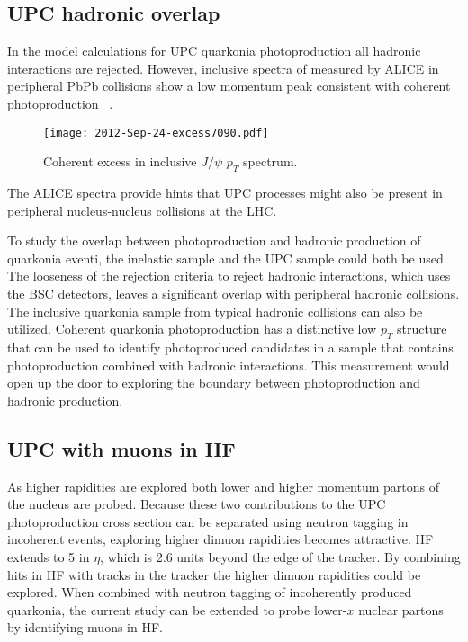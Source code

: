     \subsection{UPC hadronic overlap}
      In the model calculations for UPC quarkonia 
        photoproduction all hadronic interactions are rejected.
      However, inclusive \pt{} spectra of \JPsi{} measured by ALICE in 
        peripheral PbPb collisions show a low momentum peak consistent with 
        coherent photoproduction ~\cite{aliceIclJpsi}.
      \begin{figure}[h]
        \centering
        \texttt{[image: 2012-Sep-24-excess7090.pdf]}
        \caption{Coherent excess in inclusive $J/\psi$ $p_{T}$ spectrum.}
        \label{fig:alicePtSpecLowPt}
      \end{figure}
      The ALICE spectra provide hints that UPC processes might also be present 
        in peripheral nucleus-nucleus collisions at the LHC.
      
      To study the overlap between photoproduction and hadronic production of 
        quarkonia eventi, the inelastic sample and the UPC sample could both be
        used. 
      The looseness of the rejection criteria to reject hadronic interactions,
        which uses the BSC detectors, leaves a significant overlap with 
        peripheral hadronic collisions. 
      The inclusive quarkonia sample from typical hadronic collisions can also 
        be utilized. 
      Coherent quarkonia photoproduction has a distinctive low $p_{T}$ structure
        that can be used to identify photoproduced candidates in a sample that 
        contains photoproduction combined with hadronic interactions.
      This measurement would open up the door to exploring the boundary between
        photoproduction and hadronic production.

    \subsection{UPC \JPsi{} with muons in HF}
      As higher rapidities are explored both lower and higher momentum partons
        of the nucleus are probed. 
      Because these two contributions to the UPC photoproduction cross section 
        can be separated using neutron tagging in incoherent events, exploring
        higher dimuon rapidities becomes attractive.
      HF extends to 5 in $\eta$, which is 2.6 units beyond the edge of the 
        tracker.
      By combining hits in HF with tracks in the tracker the higher dimuon 
        rapidities could be explored. 
      When combined with neutron tagging of incoherently produced quarkonia,
        the current study can be extended to probe lower-$x$ nuclear partons 
        by identifying muons in HF. 


